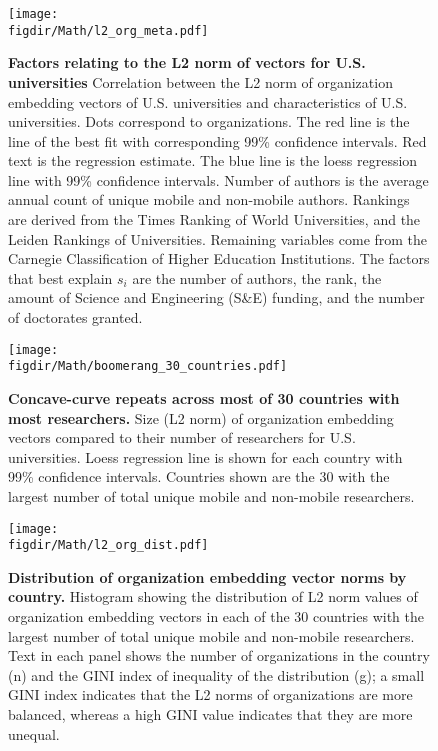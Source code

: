 \documentclass[12pt]{article} %
\def\figdir{../Figs}
\begin{document}
%
%
\begin{figure}[hp!]
	\centering
	\texttt{[image: \\figdir/Math/l2\_org\_meta.pdf]}
	\caption{
		\textbf{Factors relating to the L2 norm of vectors for U.S. universities}
		Correlation between the L2 norm of organization embedding vectors of U.S. universities and characteristics of U.S. universities.
		Dots correspond to organizations.
		The red line is the line of  the best fit with corresponding 99\% confidence intervals.
		Red text is the regression estimate.
		The blue line is the loess regression line with 99\% confidence intervals.
		Number of authors is the average annual count of unique mobile and non-mobile authors.
		Rankings are derived from the Times Ranking of World Universities, and the Leiden Rankings of Universities.
		Remaining variables come from the Carnegie Classification of Higher Education Institutions.
		The factors that best explain $s_i$ are the number of authors, the rank, the amount of Science and Engineering (S\&E) funding, and the number of doctorates granted.
	}
	\label{fig:supp:length_vs_metaInfo}
\end{figure}



%
%
\begin{figure}[h!]
	\centering
	\texttt{[image: \\figdir/Math/boomerang\_30\_countries.pdf]}
	\caption{
		\textbf{Concave-curve repeats across most of 30 countries with most researchers.}
		Size (L2 norm) of organization embedding vectors compared to their number of researchers for U.S. universities.
		Loess regression line is shown for each country with 99\% confidence intervals.
		Countries shown are the 30 with the largest number of total unique mobile and non-mobile researchers.
	}
	\label{fig:concave30}
\end{figure}



%
%
\begin{figure}[h!]
	\centering
	\texttt{[image: \\figdir/Math/l2\_org\_dist.pdf]}
	\caption{
		\textbf{Distribution of organization embedding vector norms by country.}
		Histogram showing the distribution of L2 norm values of organization embedding vectors in each of the 30 countries with the largest number of total unique mobile and non-mobile researchers.
		Text in each panel shows the number of organizations in the country (n) and the GINI index of inequality of the distribution (g);
		a small GINI index indicates that the L2 norms of organizations are more balanced, whereas a high GINI value indicates that they are more unequal.
	}
	\label{fig:norm_dist}
\end{figure}


\clearpage
\printbibliography{}
    
\end{document}
